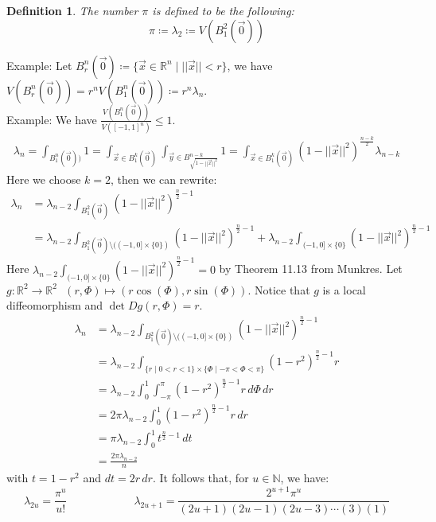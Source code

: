 \documentclass[11pt,oneside]{book}
\theoremstyle{break}
\theoremstyle{break}
\newtheorem{defn}{Definition}[corL]
\newcommand{\R}{\mathbb{R}}
\newcommand{\N}{\mathbb{N}}
\newcommand{\example}{\color{green}Example: \color{black}}
\begin{document}
\newpage
\begin{defn}
The number $\pi$ is defined to be the following:
$$\pi \coloneqq \lambda_2 \coloneqq V(B_1^2(\vec{0}))$$
\end{defn}

\hfill\break

\example Let $B_r^n(\vec{0}) \coloneqq \{ \vec{x}\in \R^n \mid ||\vec{x}|| <r\}$, we have $V(B_r^n(\vec{0})) = r^n V(B_1^n(\vec{0})) \coloneqq r^n\lambda_n$.\\


\example We have $\frac{V(B_1^n(\vec{0}))}{V([-1,1]^n)} \leq 1$.
\begin{align*}
\lambda_n = \int_{B_1^n(\vec{0}))} 1 = \int_{\vec{x}\in B_1^k (\vec{0})} \int_{\vec{y}\in B_{\sqrt{1-||\vec{x}||^2}}^{n-k}} 1 = \int_{\vec{x}\in B_1^k(\vec{0})} \left(1-||\vec{x}||^2\right)^{\frac{n-k}{2}} \lambda_{n-k} 
\end{align*}
Here we choose $k=2$, then we can rewrite:
\begin{align*}
\lambda_n &= \lambda_{n-2} \int_{B_1^2(\vec{0})} (1-||\vec{x}||^2)^{\frac{n}{2}-1} \\&= \lambda_{n-2} \int_{B_1^2(\vec{0})\setminus ((-1,0]\times \{0\})} (1-||\vec{x}||^2)^{\frac{n}{2}-1} + \lambda_{n-2} \int_{(-1,0]\times \{0\}} ( 1-||\vec{x}||^2)^{\frac{n}{2}-1}
\end{align*}
Here $\lambda_{n-2} \int_{(-1,0]\times \{0\}} ( 1-||\vec{x}||^2)^{\frac{n}{2}-1} = 0$ by Theorem 11.13 from Munkres. Let $g:\R^2 \to \R^2 \ \ \ (r,\Phi) \mapsto (r\cos(\Phi),r\sin(\Phi))$. Notice that $g$ is a local diffeomorphism and $\det Dg(r,\Phi) = r$.  
\begin{align*}
\lambda_n &=  \lambda_{n-2} \int_{B_1^2(\vec{0})\setminus ((-1,0]\times \{0\})} (1-||\vec{x}||^2)^{\frac{n}{2}-1} \\
&= \lambda_{n-2} \int_{\{r \mid 0<r<1\}\times \{\Phi \mid -\pi<\Phi <\pi\}} (1-r^2)^{\frac{n}{2}-1} r\\
&= \lambda_{n-2} \int_0^1 \int_{-\pi}^\pi (1-r^2)^{\frac{n}{2}-1} r\, d\Phi\, dr\\
&= 2 \pi \lambda_{n-2} \int_0^1 (1-r^2)^{\frac{n}{2}-1} r\, dr\\
&= \pi \lambda_{n-2} \int_{0}^1 t^{\frac{n}{2}-1}\, dt \\
&= \frac{2\pi\lambda_{n-2}}{n}
\end{align*}
with $t =1-r^2$ and $dt = 2r\, dr$. It follows that, for $u \in \N$, we have: $$\lambda_{2u} = \frac{\pi^u}{u!} \qquad\qquad\qquad\lambda_{2u+1} = \frac{2^{u+1}\pi^u}{(2u+1)(2u-1)(2u-3)\cdots(3)(1)}$$
\end{document}
